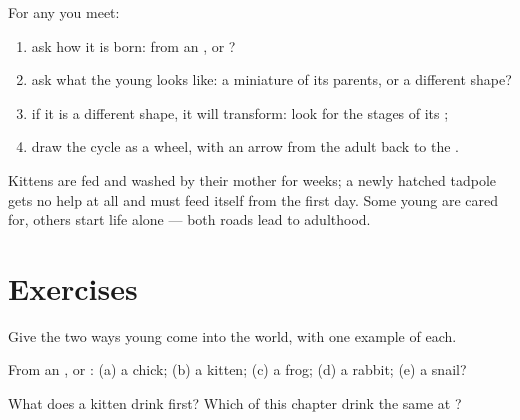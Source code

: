 \begin{method}\label{met:g2:animals-grow-up:read}
For any  you meet:
\begin{enumerate}
  \item ask how it is born: from an , or ?
  \item ask what the young looks like: a miniature of its parents,
        or a different shape?
  \item if it is a different shape, it will transform: look for the
        stages of its ;
  \item draw the cycle as a wheel, with an arrow from the adult
        back to the .
\end{enumerate}
\end{method}

\begin{remark}\label{rem:g2:animals-grow-up:care}
Kittens are fed and washed by their mother for weeks; a newly
hatched tadpole gets no help at all and must feed itself from the
first day. Some young  are cared for, others start life
alone --- both roads lead to adulthood.
\end{remark}

\section{Exercises}

\begin{exercise}[$\star$]\label{exo:g2:animals-grow-up:1}
Give the two ways young  come into the world, with one
example of each.
\end{exercise}

\begin{exercise}[$\star$]\label{exo:g2:animals-grow-up:2}
From an , or : (a) a chick; (b) a kitten; (c) a
frog; (d) a rabbit; (e) a snail?
\end{exercise}

\begin{exercise}[$\star$]\label{exo:g2:animals-grow-up:3}
What does a kitten drink first? Which  of this chapter
drink the same at ?
\end{exercise}

